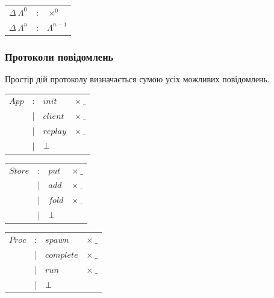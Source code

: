 \documentclass[11pt,oneside]{article}
\begin{document}

\begin{center}
\begin{tabular}{lcl}
$\Delta \ \Lambda^0$         &:& $\times^0$ \\
$\Delta \ \Lambda^{n}$       &:& $\Lambda^{n-1}$ \\
\end{tabular}
\end{center}

  \subsubsection*{Протоколи повідомлень}

   Простір дій протоколу визначається сумою усіх можливих повідомлень.

\vspace{0.5cm}

\begingroup
\parbox[l][][t]{0.33\textwidth}
{
\begin{tabular}{llll}
$App$       &:& $init$    & $\times\ \_$            \\
            &|& $client$  & $\times\ \_$          \\
            &|& $replay$  & $\times\ \_$          \\
            &|& $\bot$    & \\
\end{tabular}
}
\hspace{0.1cm}
\parbox[l][][t]{0.33\textwidth}
{
\begin{tabular}{llll}
$Store$     &:& $put$     & $\times\ \_$          \\
            &|& $add$     & $\times\ \_$          \\
            &|& $fold$    & $\times\ \_$         \\
            &|& $\bot$    & \\
\end{tabular}
}
\hspace{0.1cm}
\parbox[t][][t]{0.33\textwidth}
{
\begin{tabular}{llll}
$Proc$      &:& $spawn$       & $\times\ \_$      \\
            &|& $complete$    & $\times\ \_$         \\
            &|& $run$         & $\times\ \_$          \\
            &|& $\bot$        &
\end{tabular}
}
\endgroup
\end{document}
